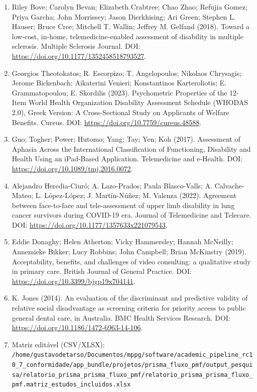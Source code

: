 \documentclass[12pt,a4paper]{article}
\begin{document}
\begin{enumerate}
\item Riley Bove; Carolyn Bevan; Elizabeth Crabtree; Chao Zhao; Refujia Gomez; Priya Garcha; John Morrissey; Jason Dierkhising; Ari Green; Stephen L. Hauser; Bruce Cree; Mitchell T. Wallin; Jeffrey M. Gelfand (2018). Toward a low-cost, in-home, telemedicine-enabled assessment of disability in multiple sclerosis. Multiple Sclerosis Journal. DOI: \url{https://doi.org/10.1177/1352458518793527}.
\item Georgios Theotokatos; R. Escorpizo; T. Angelopoulos; Nikolaos Chrysagis; Jerome Bickenbach; Aikaterini Venieri; Konstantinos Karteroliotis; E. Grammatopoulou; E. Skordilis (2023). Psychometric Properties of the 12-Item World Health Organization Disability Assessment Schedule (WHODAS 2.0), Greek Version: A Cross-Sectional Study on Applicants of Welfare Benefits. Cureus. DOI: \url{https://doi.org/10.7759/cureus.48588}.
\item Guo; Togher; Power; Hutomo; Yang; Tay; Yen; Koh (2017). Assessment of Aphasia Across the International Classification of Functioning, Disability and Health Using an iPad-Based Application. Telemedicine and e-Health. DOI: \url{https://doi.org/10.1089/tmj.2016.0072}.
\item Alejandro Heredia-Ciuró; A. Lazo-Prados; Paula Blasco-Valls; A. Calvache-Mateo; L. López-López; J. Martín-Núñez; M. Valenza (2022). Agreement between face-to-face and tele-assessment of upper limb disability in lung cancer survivors during COVID-19 era. Journal of Telemedicine and Telecare. DOI: \url{https://doi.org/10.1177/1357633x221079543}.
\item Eddie Donaghy; Helen Atherton; Vicky Hammersley; Hannah McNeilly; Annemieke Bikker; Lucy Robbins; John Campbell; Brian McKinstry (2019). Acceptability, benefits, and challenges of video consulting: a qualitative study in primary care. British Journal of General Practice. DOI: \url{https://doi.org/10.3399/bjgp19x704141}.
\item K. Jones (2014). An evaluation of the discriminant and predictive validity of relative social disadvantage as screening criteria for priority access to public general dental care, in Australia. BMC Health Services Research. DOI: \url{https://doi.org/10.1186/1472-6963-14-106}.

\item Matriz editável (CSV/XLSX): \texttt{/home/gustavodetarso/Documentos/mppg/software/academic\_pipeline\_rc10\_7\_conformidade/app\_bundle/projetos/prisma\_fluxo\_pmf/output\_pesquisa/relatorio\_prisma\_prisma\_fluxo\_pmf/relatorio\_prisma\_prisma\_fluxo\_pmf.matriz\_estudos\_incluidos.xlsx}
\end{enumerate}
\end{document}
